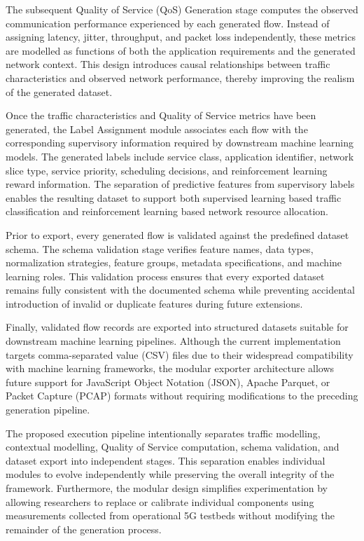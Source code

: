 \documentclass[12pt,a4paper]{article}
\begin{document}
The subsequent Quality of Service (QoS) Generation stage computes the observed communication performance experienced by each generated flow. Instead of assigning latency, jitter, throughput, and packet loss independently, these metrics are modelled as functions of both the application requirements and the generated network context. This design introduces causal relationships between traffic characteristics and observed network performance, thereby improving the realism of the generated dataset.

Once the traffic characteristics and Quality of Service metrics have been generated, the Label Assignment module associates each flow with the corresponding supervisory information required by downstream machine learning models. The generated labels include service class, application identifier, network slice type, service priority, scheduling decisions, and reinforcement learning reward information. The separation of predictive features from supervisory labels enables the resulting dataset to support both supervised learning based traffic classification and reinforcement learning based network resource allocation.

Prior to export, every generated flow is validated against the predefined dataset schema. The schema validation stage verifies feature names, data types, normalization strategies, feature groups, metadata specifications, and machine learning roles. This validation process ensures that every exported dataset remains fully consistent with the documented schema while preventing accidental introduction of invalid or duplicate features during future extensions.

Finally, validated flow records are exported into structured datasets suitable for downstream machine learning pipelines. Although the current implementation targets comma-separated value (CSV) files due to their widespread compatibility with machine learning frameworks, the modular exporter architecture allows future support for JavaScript Object Notation (JSON), Apache Parquet, or Packet Capture (PCAP) formats without requiring modifications to the preceding generation pipeline.

The proposed execution pipeline intentionally separates traffic modelling, contextual modelling, Quality of Service computation, schema validation, and dataset export into independent stages. This separation enables individual modules to evolve independently while preserving the overall integrity of the framework. Furthermore, the modular design simplifies experimentation by allowing researchers to replace or calibrate individual components using measurements collected from operational 5G testbeds without modifying the remainder of the generation process.
\end{document}
